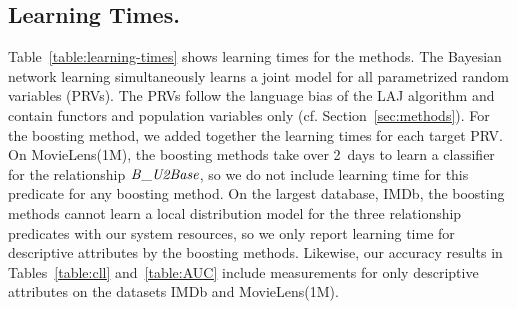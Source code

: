 \documentclass[runningheads,a4paper]{llncs}
\begin{document}
\subsection{Learning Times.} Table~\ref{table:learning-times} shows learning times for the methods. The Bayesian network  learning simultaneously learns a joint model for all parametrized random variables (PRVs). The PRVs follow the language bias of the LAJ algorithm and contain functors and population variables only (cf. Section~\ref{sec:methods}). 
For the boosting method, we added together the learning times for each target PRV. 
On MovieLens(1M), the boosting methods take over 2~days to learn a classifier for the relationship $\it{B\_U2Base}$, so we do not include learning time for this predicate for any boosting method.
On the largest database, IMDb, the boosting methods cannot learn a local distribution model for the three relationship predicates with our system resources, so we only report learning time for descriptive attributes by the boosting methods. Likewise, our accuracy results in Tables~\ref{table:cll} and~\ref{table:AUC} include measurements for only descriptive attributes on the datasets IMDb and MovieLens(1M).
\end{document}
